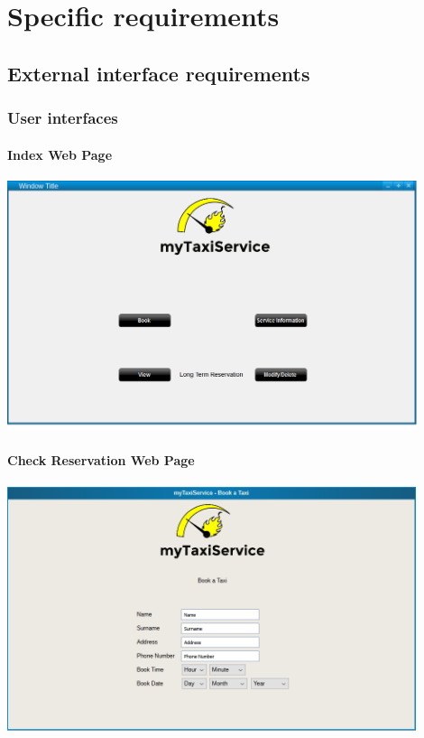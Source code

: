 \section{Specific requirements}
	\subsection{External interface requirements}
		\subsubsection{User interfaces}
		\paragraph{Index Web Page}
		\begin{center}
			\includegraphics[width=0.90\textwidth]{./images/index}
		\end{center}
		\paragraph{Check Reservation Web Page}
		\begin{center}
			\includegraphics[width=0.90\textwidth]{./images/check_reservation}
		\end{center}
